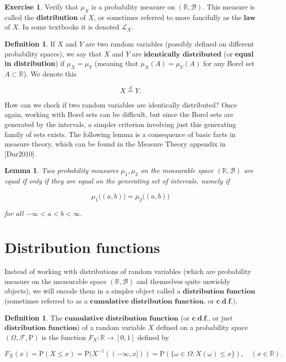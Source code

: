 \documentclass[11pt]{report}
\providecommand{\cal}{\mathcal}
\newcommand{\R}{\mathbb{R}}
\theoremstyle{plain}
\newtheorem{lem}[thm]{Lemma}
\theoremstyle{definition}
\newtheorem{defn}[thm]{Definition}
\newtheorem{xexercise}[thm]{Exercise}
\begin{document}
\begin{xexercise}
Verify that $\mu_X$ is a probability measure on
$(\R, {\cal B})$. This measure is called the
\textbf{distribution} of $X$, or sometimes referred
to more fancifully as the $\textbf{law}$ of $X$. In
some textbooks it is denoted ${\cal L}_X$.
\end{xexercise}

\begin{defn}
If $X$ and $Y$ are two random variables (possibly
defined on different probability spaces), we say that
$X$ and $Y$ are $\textbf{identically distributed}$
(or \textbf{equal in distribution}) if $\mu_X = \mu_Y$
(meaning that $\mu_X(A) = \mu_Y(A)$ for any Borel set
$A\subset \R$). We denote this

\[
X \stackrel{d}{=} Y.
\]

\end{defn}

How can we check if two random variables are
identically distributed? Once again, working with
Borel sets can be difficult, but since the Borel sets
are generated by the intervals, a simpler criterion
involving just this generating family of sets exists.
The following lemma is a consequence of basic facts in
measure theory, which can be found in the Measure
Theory appendix in [Dur2010].

\begin{lem}
Two probability measures $\mu_1, \mu_2$ on the
measurable space $(\R, {\cal B})$ are equal if only
if they are equal on the generating set of intervals,
namely if

\[
\mu_1\big((a,b)\big) = \mu_2\big((a,b)\big)
\]

for all $-\infty < a<b < \infty$.
\end{lem}

\section{Distribution functions}
\label{sec:dist-funs}
Instead of working with distributions of random
variables (which are probability measure on the
measurable space $(\R, {\cal B})$ and themselves
quite unwieldy objects), we will encode them in a
simpler object called a
$\textbf{distribution function}$ (sometimes referred
to as a $\textbf{cumulative distribution function}$,
or $\textbf{c.d.f.})$.

\begin{defn}
The $\textbf{cumulative distribution function}$ (or
$\textbf{c.d.f.}$, or just
$\textbf{distribution function}$) of a random
variable $X$ defined on a probability space
$(\Omega, {\cal F}, \mathrm{P})$ is the function
$F_X:\R \to [0,1]$ defined by

\[
F_X(x) = \mathrm{P}( X \le x ) = \mathrm{P}( X^{-1}((-\infty,x])) = \mathrm{P}( \{ \omega \in \Omega : X(\omega) \le x \} ),
\quad (x\in \R).
\]

\end{defn}
\end{document}
